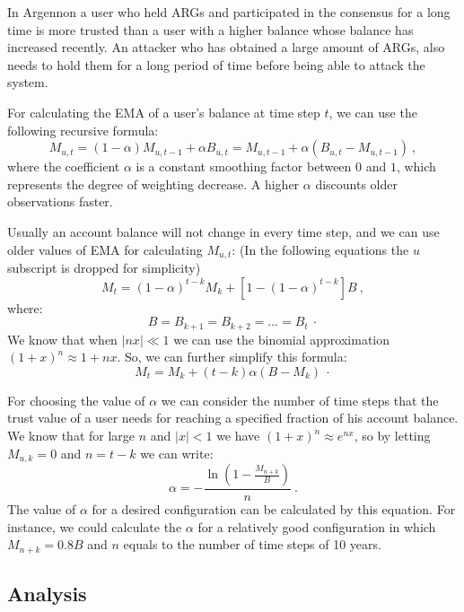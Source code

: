 In Argennon a user who held ARGs and participated in the consensus for a long time is more trusted
than a user with a higher balance whose balance has increased recently. An attacker who has obtained a large
amount of ARGs, also needs to hold them for a long period of time before being able to attack the system.

For calculating the EMA of a user's balance at time step \(t\), we can use the following
recursive formula:
\[
    M_{u,t} = (1 - \alpha) M_{u,t-1} + \alpha B_{u,t} = M_{u,t-1} + \alpha (B_{u,t} - M_{u,t-1})\ ,
\]
where the coefficient \(\alpha\) is a constant smoothing factor between \(0\) and \(1\), which represents the
degree of weighting decrease. A higher \(\alpha\) discounts older observations faster.

Usually an account balance will not change in every time step, and we can use older values of EMA for calculating
\(M_{u,t}\): (In the following equations the \(u\) subscript is dropped for simplicity)
\[
    M_{t} = (1 - \alpha)^{t-k}M_{k} + [1 - (1 - \alpha)^{t - k}]B\ ,
\]
where:
\[
    B = B_{k+1} = B_{k+2} = \dots = B_{t}\ \cdot
\]
We know that when \(|nx| \ll 1\) we can use the binomial approximation \({(1 + x)^n \approx 1 + nx}\). So, we can
further simplify this formula:
\[
    M_{t} = M_{k} + (t - k) \alpha (B - M_{k})\ \cdot
\]

For choosing the value of \(\alpha\) we can consider the number of time steps that the trust value of a user needs
for reaching a specified fraction of his account balance. We know that for large \(n\) and \(|x| < 1\) we have
\((1 + x)^n \approx e^{nx}\), so by letting \(M_{u,k} = 0\) and \(n = t - k\) we can write:
\begin{equation}
    \alpha =- \frac{\ln\left(1 - \frac{M_{n+k}}{B}\right)}{n}\ .\label{eq:alpha}
\end{equation}
The value of \(\alpha\) for a desired configuration can be calculated by this equation. For instance, we could
calculate the \(\alpha\) for a relatively good configuration in which \(M_{n+k} = 0.8B\) and \(n\) equals to the
number of time steps of 10 years.

\subsection{Analysis}\label{subsec:consensus-math}
